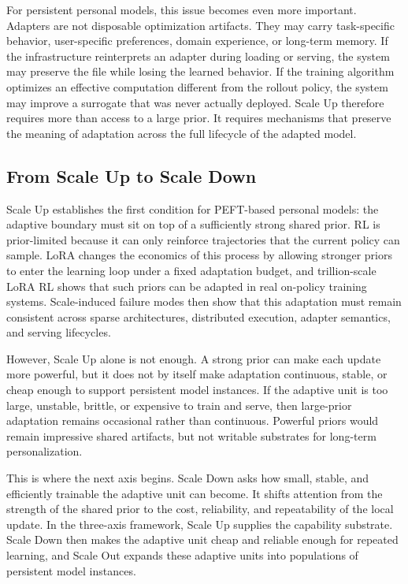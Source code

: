 \documentclass{llmxive}
\begin{document}
For persistent personal models, this issue becomes even more important. Adapters are not disposable optimization artifacts. They may carry task-specific behavior, user-specific preferences, domain experience, or long-term memory. If the infrastructure reinterprets an adapter during loading or serving, the system may preserve the file while losing the learned behavior. If the training algorithm optimizes an effective computation different from the rollout policy, the system may improve a surrogate that was never actually deployed. Scale Up therefore requires more than access to a large prior. It requires mechanisms that preserve the meaning of adaptation across the full lifecycle of the adapted model.

\subsection{From Scale Up to Scale Down}\label{subsec:scale-up-to-down}

Scale Up establishes the first condition for PEFT-based personal models: the adaptive boundary must sit on top of a sufficiently strong shared prior. RL is prior-limited because it can only reinforce trajectories that the current policy can sample. LoRA changes the economics of this process by allowing stronger priors to enter the learning loop under a fixed adaptation budget, and trillion-scale LoRA RL shows that such priors can be adapted in real on-policy training systems. Scale-induced failure modes then show that this adaptation must remain consistent across sparse architectures, distributed execution, adapter semantics, and serving lifecycles.

However, Scale Up alone is not enough. A strong prior can make each update more powerful, but it does not by itself make adaptation continuous, stable, or cheap enough to support persistent model instances. If the adaptive unit is too large, unstable, brittle, or expensive to train and serve, then large-prior adaptation remains occasional rather than continuous. Powerful priors would remain impressive shared artifacts, but not writable substrates for long-term personalization.

This is where the next axis begins. Scale Down asks how small, stable, and efficiently trainable the adaptive unit can become. It shifts attention from the strength of the shared prior to the cost, reliability, and repeatability of the local update. In the three-axis framework, Scale Up supplies the capability substrate. Scale Down then makes the adaptive unit cheap and reliable enough for repeated learning, and Scale Out expands these adaptive units into populations of persistent model instances.
\end{document}
